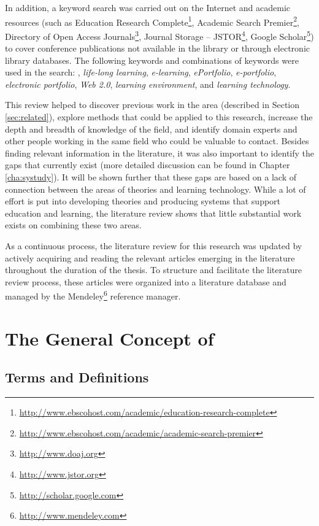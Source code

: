 In addition, a keyword search was carried out on the Internet and academic
resources (such as Education Research
Complete\footnote{\url{http://www.ebscohost.com/academic/education-research-complete}},
Academic Search
Premier\footnote{\url{http://www.ebscohost.com/academic/academic-search-premier}},
Directory of Open Access Journals\footnote{\url{http://www.doaj.org}}, Journal
Storage -- JSTOR\footnote{\url{http://www.jstor.org}}, Google
Scholar\footnote{\url{http://scholar.google.com}}) to cover conference publications not available in the library or through electronic library
databases. The following keywords and combinations of keywords were used in the
search: \textit{\LLLsn}, \textit{life-long learning}, \textit{e-learning},
\textit{ePortfolio}, \textit{e-portfolio}, \textit{electronic portfolio},
\textit{Web 2.0}, \textit{learning environment}, and \textit{learning technology}.

This review helped to discover previous work in the area (described in Section
\ref{sec:related}), explore methods that could be applied to this research,
increase the depth and breadth of knowledge of the field, and identify domain
experts and other people working in the same field who could be valuable to
contact. Besides finding relevant information in the literature, it was also
important to identify the gaps that currently exist (more detailed discussion
can be found in Chapter \ref{cha:systudy}). It will be shown further that these
gaps are based on a lack of connection between the areas of \LLLs theories and
learning technology. While a lot of effort is put into developing theories and
producing systems that support education and learning, the literature review
shows that little substantial work exists on combining these two areas.

As a continuous process, the literature review for this research was updated by
actively acquiring and reading the relevant articles emerging in the literature
throughout the duration of the thesis. To structure and facilitate the
literature review process, these articles were organized into a literature
database and managed by the Mendeley\footnote{\url{http://www.mendeley.com}}
reference manager.

\section{The General Concept of \LLLc}
\label{sec:concepts}
\subsection{Terms and Definitions}

